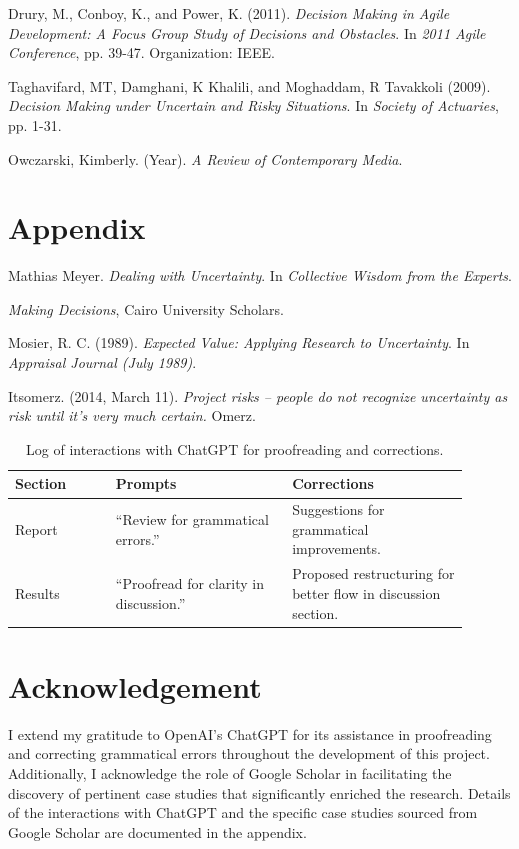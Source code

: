 \documentclass{article}
\begin{document}
\begin{thebibliography}{9}
Drury, M., Conboy, K., and Power, K. (2011). \textit{Decision Making in Agile Development: A Focus Group Study of Decisions and Obstacles}. In \textit{2011 Agile Conference}, pp. 39-47. Organization: IEEE.

Taghavifard, MT, Damghani, K Khalili, and Moghaddam, R Tavakkoli (2009). \textit{Decision Making under Uncertain and Risky Situations}. In \textit{Society of Actuaries}, pp. 1-31.

Owczarski, Kimberly. (Year). \textit{A Review of Contemporary Media}.


\section*{Appendix}
Mathias Meyer. \textit{Dealing with Uncertainty}. In \textit{Collective Wisdom from the Experts}.

\textit{Making Decisions}, Cairo University Scholars.

Mosier, R. C. (1989). \textit{Expected Value: Applying Research to Uncertainty}. In \textit{Appraisal Journal (July 1989)}.

Itsomerz. (2014, March 11).\textit{ Project risks – people do not recognize uncertainty as risk until it’s very much certain. }Omerz.

\begin{table}[h]
\centering
\begin{tabular}{|p{0.2\linewidth}|p{0.35\linewidth}|p{0.35\linewidth}|}
\hline
\textbf{Section} & \textbf{Prompts} & \textbf{Corrections} \\
\hline
Report & ``Review for grammatical errors.'' & Suggestions for grammatical improvements. \\
\hline
Results & ``Proofread  for clarity in discussion.'' & Proposed restructuring for better flow in discussion section. \\
\hline
\end{tabular}
\caption{Log of interactions with ChatGPT for proofreading and corrections.}
\label{tab:chatgpt-log}
\end{table}


\end{thebibliography}
\section*{Acknowledgement}
I extend my gratitude to OpenAI's ChatGPT for its assistance in proofreading and correcting grammatical errors throughout the development of this project. Additionally, I acknowledge the role of Google Scholar in facilitating the discovery of pertinent case studies that significantly enriched the research. Details of the interactions with ChatGPT and the specific case studies sourced from Google Scholar are documented in the appendix.
\end{document}

